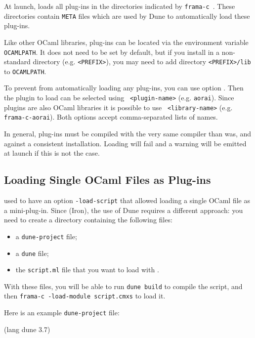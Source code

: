 At launch, \FramaC loads all plug-ins in the
directories indicated by \texttt{frama-c }.
These directories contain \texttt{META} files which are used by Dune to
automatically load these plug-ins.

Like other OCaml libraries, \FramaC plug-ins can be located via the environment
variable \texttt{OCAMLPATH}. It does not need to be set by
default, but if you install \FramaC in a non-standard directory
(e.g. \texttt{<PREFIX>}), you may need to add directory \texttt{<PREFIX>/lib}
to \texttt{OCAMLPATH}.

To prevent \FramaC from automatically loading any plug-ins, you can use option
. Then the plugin to load can be selected
using \texttt{ <plugin-name>} (e.g. \texttt{aorai}).
Since \FramaC plugins are also OCaml libraries it is possible to use
\texttt{ <library-name>}
(e.g. \texttt{frama-c-aorai}).
Both options accept comma-separated lists of names.

\begin{important}
In general, plug-ins must be compiled with the
very same \caml compiler than \FramaC was, and against a consistent \FramaC
installation. Loading will fail and a warning will be emitted at launch if this
is not the case.
\end{important}

\subsection{Loading Single OCaml Files as Plug-ins}

\FramaC used to have an option \texttt{-load-script} that allowed loading a
single OCaml file as a mini-plug-in. Since  (Iron), the use of Dune
requires a different approach: you need to create a directory containing the
following files:
\begin{itemize}
\item a \texttt{dune-project} file;
\item a \texttt{dune} file;
\item the \texttt{script.ml} file that you want to load with \FramaC.
\end{itemize}
With these files, you will be able to run \texttt{dune build} to compile the
script, and then \texttt{frama-c -load-module script.cmxs} to load it.

Here is an example \texttt{dune-project} file:
\begin{dunecode}
(lang dune 3.7)
\end{dunecode}

